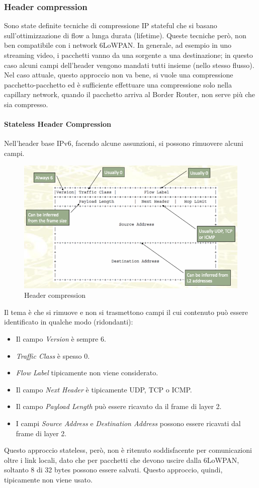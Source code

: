 \documentclass{article}
\begin{document}
\subsubsection{Header compression}
Sono state definite tecniche di compressione IP stateful che si basano sull'ottimizzazione di flow a lunga durata (lifetime). Queste tecniche però, non  ben compatibile con i network 6LoWPAN. In generale, ad esempio in uno streaming video, i pacchetti vanno da una sorgente a una destinazione; in questo caso alcuni campi dell'header vengono mandati tutti insieme (nello stesso flusso). Nel caso attuale, questo approccio non va bene, si vuole una compressione pacchetto-pacchetto ed è sufficiente effettuare una compressione solo nella capillary network, quando il pacchetto arriva al Border Router, non serve più che sia compresso.
\paragraph{Stateless Header Compression}
Nell'header base IPv6, facendo alcune assunzioni, si possono rimuovere alcuni campi.
\begin{figure}[H]
\centering
\includegraphics[scale=0.4]{figures/header compression.png}
\caption{Header compression}
\end{figure}
Il tema è che si rimuove e non si trasmettono campi il cui contenuto può essere identificato in qualche modo (ridondanti):
\begin{itemize}
    \item Il campo \textit{Version} è sempre 6.
    \item \textit{Traffic Class} è spesso 0.
    \item \textit{Flow Label} tipicamente non viene considerato.
    \item Il campo \textit{Next Header} è tipicamente UDP, TCP o ICMP.
    \item Il campo \textit{Payload Length} può essere ricavato da il frame di layer 2.
    \item I campi \textit{Source Address} e \textit{Destination Address} possono essere ricavati dal frame di layer 2.
\end{itemize}
Questo approccio stateless, però, non è ritenuto soddisfacente per comunicazioni oltre i link locali, dato che per pacchetti che devono uscire dalla 6LoWPAN, soltanto 8 di 32 bytes possono essere salvati. Questo approccio, quindi, tipicamente non viene usato.
\end{document}
